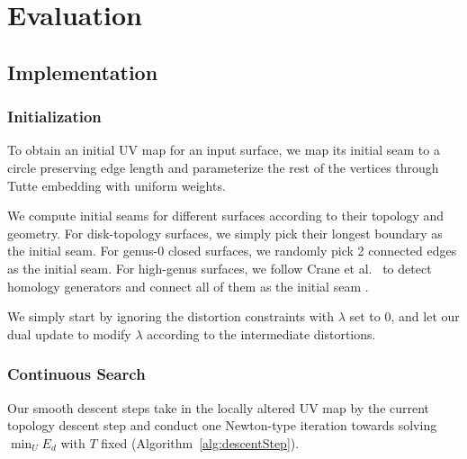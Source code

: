 
\section{Evaluation}
\label{sec:results}

\subsection{Implementation}
\label{sec:imp}



\subsubsection{Initialization}
To obtain an initial UV map for an input surface, we map its initial seam to a circle preserving edge length and parameterize the rest of the vertices through Tutte embedding with uniform weights.

We compute initial seams for different surfaces according to their topology and geometry. For disk-topology surfaces, we simply pick their longest boundary as the initial seam. For genus-0 closed surfaces, we randomly pick 2 connected edges as the initial seam.  For high-genus surfaces, we follow Crane et al.~ to detect homology generators and connect all of them as the initial seam \minchen{[TODO]}.

We simply start by ignoring the distortion constraints with $\lambda$ set to $0$, and let our dual update to modify $\lambda$ according to the intermediate distortions.

\subsubsection{Continuous Search}
\label{sec:descentStep}

Our smooth descent steps take in the locally altered UV map by the current topology descent step and conduct one Newton-type iteration towards solving $\min_U E_d$ with $T$ fixed (Algorithm~\ref{alg:descentStep}).

